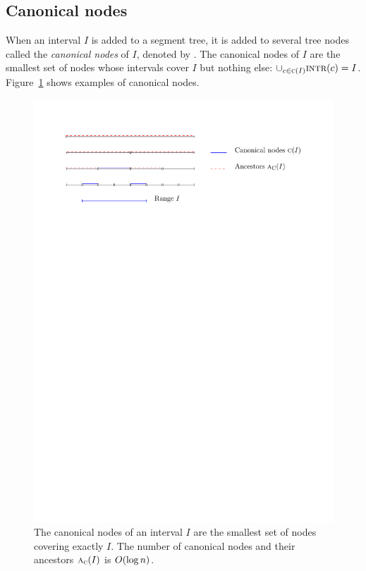 \documentclass[english,gradu]{tktltiki2018}
\begin{document}
\subsection{Canonical nodes}

When an interval $I$ is added to a segment tree, it is added to several tree nodes called the \emph{canonical nodes} of $I$, denoted by .
The canonical nodes of $I$ are the smallest set of nodes whose intervals cover $I$ but nothing else: $\cup_{c\in\textsc{c}(I)} \textsc{intr}(c)=I$.
Figure~\ref{fig:canon} shows examples of canonical nodes.

\begin{figure}\centering
	\includegraphics[scale=0.75,page=1]{fig/canon}
	\caption{The canonical nodes of an interval $I$ are the smallest set of nodes covering exactly $I$.
	The number of canonical nodes and their ancestors $\textsc{a}_{\textsc{c}}(I)$ is $O(\log n)$.}\label{fig:canon}
\end{figure}
\end{document}
